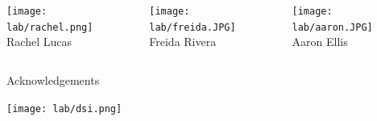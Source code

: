 \begin{frame}[c]{}
\begin{columns}[t]
\begin{column}[T]{3.5in}
\begin{columns}[t]
			
				\begin{column}[T]{1in}
					{\centering
						\texttt{[image: lab/rachel.png]} \\
						\vspace{-.1in}
						{\tiny Rachel Lucas} \\
						\par
					}
				\end{column}
			
				\begin{column}[T]{1in}
					{\centering
						\texttt{[image: lab/freida.JPG]} \\
						\vspace{-.1in}
						{\tiny Freida Rivera} \\
						\par
					}
				\end{column}
			
				\begin{column}[T]{1in}
					{\centering
						\texttt{[image: lab/aaron.JPG]} \\
						\vspace{-.1in}
						{\tiny Aaron Ellis} \\
						\par
					}
				\end{column}
				
				
			\end{columns}
		\end{column}


	\end{columns}

	
	
\end{frame}



\begin{frame}[c]{Acknowledgements}
	
	{\centering
		\texttt{[image: lab/dsi.png]} \\
		\par
	}
	
	
\end{frame}








